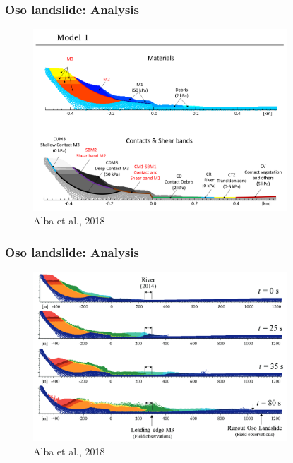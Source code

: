 \documentclass[notes]{beamer}
\begin{document}
\begin{frame}
	\frametitle{Oso landslide: Analysis}
	\begin{figure}
		\includegraphics[width=0.85\textwidth]{figs/oso/mpm-setup.png}
		\caption*{Alba et al., 2018}
	\end{figure}
\end{frame}

\begin{frame}
	\frametitle{Oso landslide: Analysis}
	\begin{figure}
		\includegraphics[width=0.85\textwidth]{figs/oso/oso-simulation.png}
		\caption*{Alba et al., 2018}
	\end{figure}
\end{frame}
\end{document}
